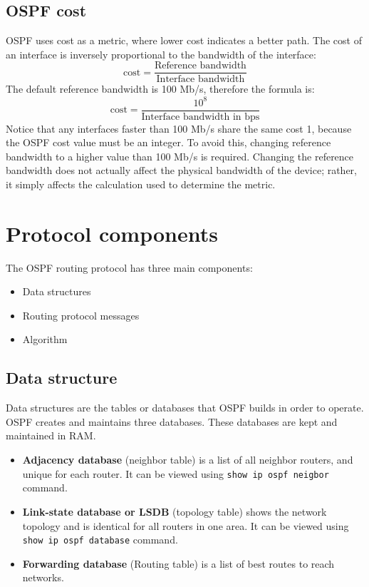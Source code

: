 \subsection{OSPF cost}
OSPF uses cost as a metric, where lower cost indicates a better path. The cost of an interface is inversely proportional to the bandwidth of the interface:%
\[ \text{cost}=\frac{\text{Reference bandwidth}}{\text{Interface bandwidth}} \]
The default reference bandwidth is 100 Mb/s, therefore the formula is:
\[ \text{cost}=\frac{10^8}{\text{Interface bandwidth in bps}} \]
Notice that any interfaces faster than 100 Mb/s share the same cost 1, because the OSPF cost value must be an integer. To avoid this, changing reference bandwidth to a higher value than 100 Mb/s is required. \note Changing the reference bandwidth does not actually affect the physical bandwidth of the device; rather, it simply affects the calculation used to determine the metric.

\section{Protocol components}
The OSPF routing protocol has three main components:
\begin{itemize}
	\item Data structures
	\item Routing protocol messages
	\item Algorithm
	\end{itemize}
\subsection{Data structure}
Data structures are the tables or databases that OSPF builds in order to operate. OSPF creates and maintains three databases. These databases are kept and maintained in RAM.
\begin{itemize}
	\item \textbf{Adjacency database} (neighbor table) is a list of all neighbor routers, and unique for each router. It can be viewed using \texttt{show ip ospf neigbor} command.
	\item \textbf{Link-state database or LSDB} (topology table) shows the network topology and is identical for all routers in one area. It can be viewed using \texttt{show ip ospf database} command.
	\item \textbf{Forwarding database} (Routing table) is a list of best routes to reach networks.
\end{itemize}
